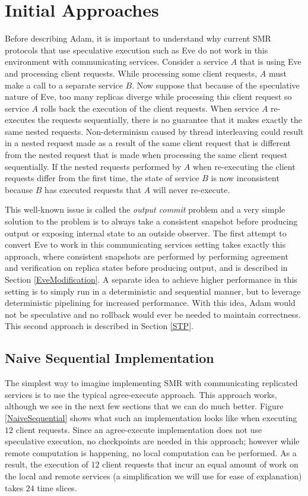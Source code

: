 \documentclass[11pt, oneside]{report}
\begin{document}
\section{Initial Approaches}

Before describing Adam, it is important to understand why current SMR protocols that use speculative execution such as Eve do not work in this environment with communicating services. 
Consider a service $A$ that is using Eve and processing client requests. 
While processing some client requests, $A$ must make a call to a separate service $B$. 
Now suppose that because of the speculative nature of Eve, too many replicas diverge while processing this client request so service $A$ rolls back the execution of the client requests.
When service $A$ re-executes the requests sequentially, there is no guarantee that it makes exactly the same nested requests. 
Non-determinism caused by thread interleaving could result in a nested request made as a result of the same client request that is different from the nested request that is made when processing the same client request sequentially.
If the nested requests performed by $A$ when re-executing the client requests differ from the first time, the state of service $B$ is now inconsistent because $B$ has executed requests that $A$ will never re-execute.

This well-known issue is called the \emph{output commit} problem \cite{mootaz} and a very simple solution to the problem is to always take a consistent snapshot before producing output or exposing internal state to an outside observer. 
The first attempt to convert Eve to work in this communicating services setting takes exactly this approach, where consistent snapshots are performed by performing agreement and verification on replica states before producing output, and is described in Section \ref{EveModification}. 
A separate idea to achieve higher performance in this setting is to simply run in a deterministic and sequential manner, but to leverage deterministic pipelining for increased performance. 
With this idea, Adam would not be speculative and no rollback would ever be needed to maintain correctness. 
This second approach is described in Section \ref{STP}.

\subsection{Naive Sequential Implementation}

The simplest way to imagine implementing SMR with communicating replicated services is to use the typical agree-execute approach.
This approach works, although we see in the next few sections that we can do much better. 
Figure \ref{NaiveSequential} shows what such an implementation looks like when executing $12$ client requests. 
Since an agree-execute implementation does not use speculative execution, no checkpoints are needed in this approach; however while remote computation is happening, no local computation can be performed.
As a result, the execution of $12$ client requests that incur an equal amount of work on the local and remote services (a simplification we will use for ease of explanation) takes $24$ time slices.
\end{document}
